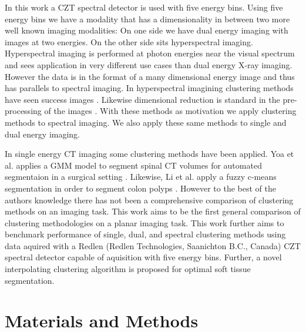 \documentclass[a4paper,11pt]{article}
\begin{document}
In this work a CZT spectral detector is used with five energy bins. Using five energy bins we have a modality that has a dimensionality in between two more well known imaging modalities: On one side we have dual energy imaging with images at two energies. On the other side sits hyperspectral imaging. Hyperspectral imaging is performed at photon energies near the visual spectrum and sees application in very different use cases than dual energy X-ray imaging. However the data is in the format of a many dimensional energy image and thus has parallels to spectral imaging. In hyperspectral imagining clustering methods have seen success images \cite{Murphy2018UnsupervisedDiffusion,Gillis2012HyperspectralGraphs,Noe2001PartialClustering}. Likewise dimensional reduction is standard in the pre-processing of the images \cite{Mahesh2015HyperspectralMaterials}. With these methods as motivation we apply clustering methods to spectral imaging. We also apply these same methods to single and dual energy imaging.

In single energy CT imaging some clustering methods have been applied. Yoa et al. applies a GMM model to segment spinal CT volumes for automated segmentaion in a surgical setting \cite{yoa}. Likewise, Li et al. apply a fuzzy c-means segmentation in order to segment colon polyps \cite{li}. However to the best of the authors knowledge there has not been a comprehensive comparison of clustering methods on an imaging task. This work aims to be the first general comparison of clustering methodologies on a planar imaging task. This work further aims to benchmark performance of single, dual, and spectral clustering methods using data aquired with a Redlen (Redlen Technologies, Saanichton B.C., Canada) CZT spectral detector capable of aquisition with five energy bins. Further, a novel interpolating clustering algorithm is proposed for optimal soft tissue segmentation.



\section{Materials and Methods}
\label{sec:methods}
\end{document}
